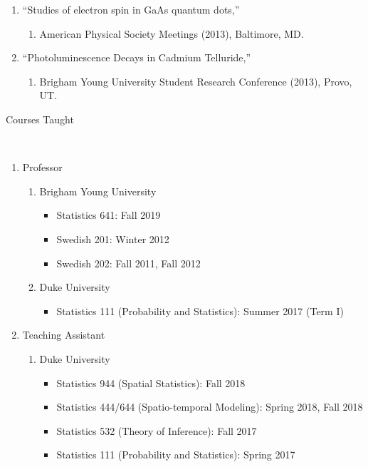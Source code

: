 \documentclass[11pt]{article}
\newcommand{\head}[1]{ %
    \bigskip %
    \begin{large}\begin{bf}{#1}\end{bf}\end{large} %

    \ \\ [-1.3cm] %

    \hrulefill}
\begin{document}
\begin{enumerate}[label=$\cdot$]
\begin{enumerate}[label=$-$]
\end{enumerate}
\item  ``Studies of electron spin in GaAs quantum dots,''
\begin{enumerate}[label=$-$]
\item  American Physical Society Meetings (2013), Baltimore, MD.
\end{enumerate}
\item  ``Photoluminescence Decays in Cadmium Telluride,'' 
\begin{enumerate}[label=$-$]
\item Brigham Young University Student Research Conference (2013), Provo, UT.
\end{enumerate}
\end{enumerate}

\head{Courses Taught}

\begin{enumerate}[label=$\bullet$]
\item Professor
\begin{enumerate}[label=$\cdot$]
\item Brigham Young University
\begin{itemize}
\item Statistics 641: Fall 2019
\item Swedish 201: Winter 2012 
\item Swedish 202: Fall 2011, Fall 2012
\end{itemize}
\item Duke University
\begin{itemize}
\item Statistics 111 (Probability and Statistics): Summer 2017 (Term I)
\end{itemize}
\end{enumerate}
\item Teaching Assistant
\begin{enumerate}[label=$\cdot$]
\item Duke University
\begin{itemize}
\item Statistics 944 (Spatial Statistics): Fall 2018
\item Statistics 444/644 (Spatio-temporal Modeling): Spring 2018, Fall 2018
\item Statistics 532 (Theory of Inference): Fall 2017
\item Statistics 111 (Probability and Statistics): Spring 2017 
\end{itemize}
\end{enumerate}
\end{enumerate}
\end{document}
